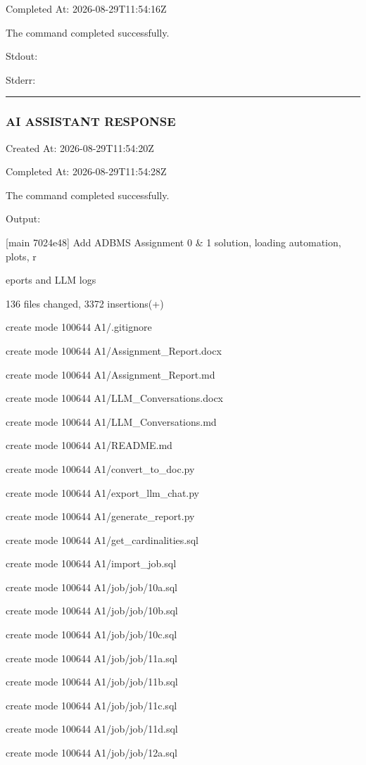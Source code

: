 \documentclass[11pt,a4paper]{article}
\begin{document}
{Completed At: 2026-08-29T11:54:16Z


The command completed successfully.

Stdout:


Stderr:


\hrule

\subsubsection{AI ASSISTANT RESPONSE}

Created At: 2026-08-29T11:54:20Z

Completed At: 2026-08-29T11:54:28Z


The command completed successfully.

Output:

[main 7024e48] Add ADBMS Assignment 0 \& 1 solution, loading automation, plots, r

eports and LLM logs

136 files changed, 3372 insertions(+)

create mode 100644 A1/.gitignore

create mode 100644 A1/Assignment\_Report.docx

create mode 100644 A1/Assignment\_Report.md

create mode 100644 A1/LLM\_Conversations.docx

create mode 100644 A1/LLM\_Conversations.md

create mode 100644 A1/README.md

create mode 100644 A1/convert\_to\_doc.py

create mode 100644 A1/export\_llm\_chat.py

create mode 100644 A1/generate\_report.py

create mode 100644 A1/get\_cardinalities.sql

create mode 100644 A1/import\_job.sql

create mode 100644 A1/job/job/10a.sql

create mode 100644 A1/job/job/10b.sql

create mode 100644 A1/job/job/10c.sql

create mode 100644 A1/job/job/11a.sql

create mode 100644 A1/job/job/11b.sql

create mode 100644 A1/job/job/11c.sql

create mode 100644 A1/job/job/11d.sql

create mode 100644 A1/job/job/12a.sql

}
\end{document}
